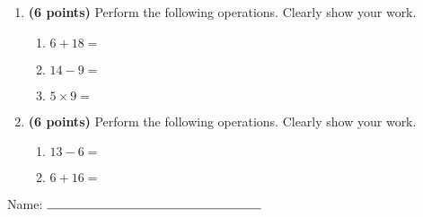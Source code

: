 \documentclass[12pt]{amsart}
\begin{document}
\newpage
\begin{enumerate}
\item {\bf (6 points)} 
 Perform the following operations. Clearly show your work. \begin{enumerate}


\def \a{6}\def \b{18}\def \apb{24}

 
\item $\a + \b = $

\vspace{2cm}
\def \a{14}\def \dif{5}\def \b{9}

 
\item $\a - \b = $

\vspace{2cm}
\def \a{5}\def \b{9}\def \ab{14}

 
\item $\a \times \b = $ 

\vspace{2cm}
\def \vshift{5}\def \hshift{4}\def \chang{0}\def \findval{4}\def \yval{5}

 
\end{enumerate}


\newpage
\item {\bf (6 points)} 
 Perform the following operations. Clearly show your work. \begin{enumerate}


\def \a{13}\def \dif{7}\def \b{6}

 
\item $\a - \b = $

\vspace{2cm}
\def \a{6}\def \b{16}\def \apb{22}

 
\item $\a + \b = $

\vspace{2cm}
\def \vshift{1}\def \hshift{4}\def \chang{-2}\def \findval{2}\def \yval{5}

 
\end{enumerate}


\newpage\end{enumerate}\graphicspath{{C:/Users/iainc/anaconda3/Randomizer/Sample Course/Sample Assessment 2/}}\setcounter{page}{1}


\thispagestyle{fancy}

 
\noindent Name: $\rule{6cm}{0.15mm}$

\vspace{.2cm}
\end{document}
